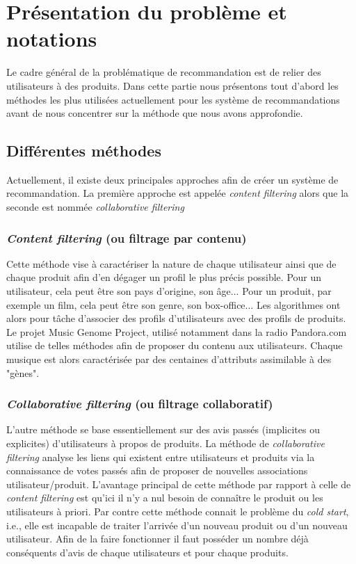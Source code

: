 \documentclass[10pt,a4paper]{article}
\begin{document}
\section{Présentation du problème et notations}

Le cadre général de la problématique de recommandation est de relier des utilisateurs à des produits. Dans cette partie nous présentons tout d'abord les méthodes les plus utilisées actuellement pour les système de recommandations avant de nous concentrer sur la méthode que nous avons approfondie.

\subsection{Différentes méthodes}

Actuellement, il existe deux principales approches afin de  créer un système de recommandation. La première approche est appelée \textit{content filtering} alors que la seconde est nommée \textit{collaborative filtering}

\subsubsection*{\textit{Content filtering} (ou filtrage par contenu)}

Cette méthode vise à caractériser la nature de chaque utilisateur ainsi que de chaque produit afin d'en dégager un profil le plus précis possible. Pour un utilisateur, cela peut être son pays d'origine, son âge... Pour un produit, par exemple un film, cela peut être son genre, son box-office... Les algorithmes ont alors pour tâche d'associer des profils d'utilisateurs avec des profils de produits. Le projet Music Genome Project, utilisé notamment dans la radio Pandora.com utilise de telles méthodes afin de proposer du contenu aux utilisateurs. Chaque musique est alors caractérisée par des centaines d'attributs assimilable à des "gènes". 


\subsubsection*{\textit{Collaborative filtering} (ou filtrage collaboratif)}

L'autre méthode se base essentiellement sur des avis passés (implicites ou explicites) d'utilisateurs à propos de produits. La méthode de \textit{collaborative filtering} analyse les liens qui existent entre utilisateurs et produits via la connaissance de votes passés afin de proposer de nouvelles associations utilisateur/produit. L'avantage principal de cette méthode par rapport à celle de \textit{content filtering} est qu'ici il n'y a nul besoin de connaître le produit ou les utilisateurs à priori. Par contre cette méthode connait le problème du \textit{cold start}, i.e., elle est incapable de traiter l'arrivée d'un nouveau produit ou d'un nouveau utilisateur. Afin de la faire fonctionner il faut posséder un nombre déjà conséquents d'avis de chaque utilisateurs et pour chaque produits.
\end{document}
